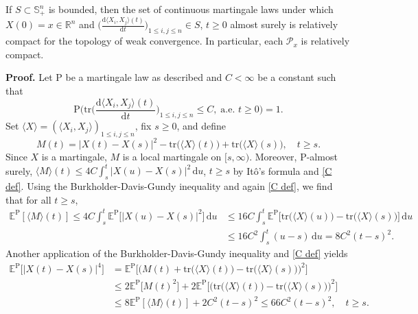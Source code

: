 \documentclass[11pt]{amsart}
\numberwithin{equation}{section}
\begin{document}
\begin{lemma}\label{lemma: precompact}
If $S \subset \mathbb{S}^n_+$ is bounded, then the set of continuous martingale laws under which $X(0)=x\in{\mathbb R}^n$ and $\big(\frac{\mathrm{d}\langle X_i,X_j\rangle(t)}{\mathrm{d}t}\big)_{1\le i,j\le n}\in S$, $t\ge0$ almost surely is relatively compact for the topology of weak convergence. In particular, each $\mathcal{P}_x$ is relatively compact. 
\end{lemma}

\smallskip

\noindent\textbf{Proof.} Let $\mathrm{P}$ be a martingale law as described and $C<\infty$ be a constant such that 
\begin{equation}\label{C def}
\mathrm{P}\bigg(\text{tr}\bigg(\frac{\mathrm{d}\langle X_i,X_j\rangle(t)}{\mathrm{d}t}\bigg)_{1\le i,j\le n}\le C,\; \text{a.e. }t\ge0\bigg)=1.
\end{equation}
Set $\langle X \rangle=(\langle X_i,X_j\rangle)_{1\le i,j\le n}$, fix $s \geq 0$, and define 
\begin{equation}
M(t) = |X(t) - X(s)|^2 - \text{tr}\big(\langle X \rangle(t)\big) + \text{tr}\big(\langle X \rangle(s)\big), \quad t \geq s. 
\end{equation}
Since $X$ is a martingale, $M$ is a local martingale on $[s, \infty)$. Moreover, $\mathrm{P}$-almost surely, $\langle M \rangle (t) \leq 4 C \int_s^t |X(u) - X(s)|^2\,\mathrm{d}u$, $t\ge s$ by It\^o's formula and \eqref{C def}. Using the Burkholder-Davis-Gundy inequality and again \eqref{C def}, we find that for all $t\ge s$,
\begin{equation*}
\begin{split}
\mathbb{E}^{\mathrm{P}}[\langle M \rangle (t)] 
\le 4C \int_s^t \mathbb{E}^{\mathrm{P}}\big[|X(u) - X(s)|^2\big]\,\mathrm{d}u 
&\le 16 C \int_s^t \mathbb{E}^{\mathrm{P}}\big[\text{tr}\big(\langle X\rangle(u)\big) - \text{tr}\big(\langle X \rangle(s)\big)\big]\,\mathrm{d}u \\
&\leq 16C^2 \int_s^t (u-s)\,\mathrm{d}u = 8C^2(t - s)^2.
\end{split}
\end{equation*} 
Another application of the Burkholder-Davis-Gundy inequality and \eqref{C def} yields
\begin{equation}\label{moment bound}
\begin{split}
\mathbb{E}^{\mathrm{P}}\big[|X(t) - X(s)|^4\big] &= \mathbb{E}^{\mathrm{P}}\big[\big(M(t) + \text{tr}\big(\langle X \rangle(t)\big) - \text{tr}\big(\langle X \rangle(s)\big)\big)^2\big] \\
& \leq 2 \mathbb{E}^{\mathrm{P}}\big[M(t)^2\big] + 2 \mathbb{E}^{\mathrm{P}}\big[\big(\text{tr}\big(\langle X\rangle(t)\big) - \text{tr}\big(\langle X \rangle(s)\big)\big)^2\big] \\
&\leq 8 \mathbb{E}^{\mathrm{P}}[\langle M \rangle (t)] + 2C^2(t - s)^2 
\leq 66C^2(t - s)^2,\quad t\ge s.
\end{split}
\end{equation}
\end{document}
